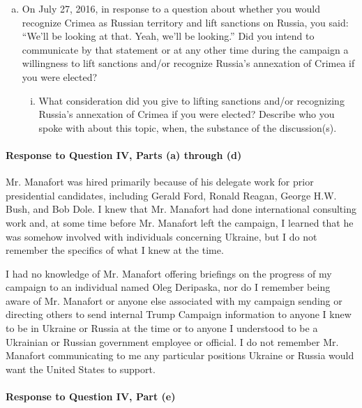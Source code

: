 \begin{enumerate}[a.]
\item On July 27, 2016, in response to a question about whether you would recognize Crimea as Russian territory and lift sanctions on Russia, you said: “We'll be looking at that. Yeah, we'll be looking.”
Did you intend to communicate by that statement or at any other time during the campaign a willingness to lift sanctions and/or recognize Russia’s annexation of Crimea if you were elected?

\begin{enumerate}[i.]

\item What consideration did you give to lifting sanctions and/or recognizing Russia’s annexation of Crimea if you were elected?
Describe who you spoke with about this topic, when, the substance of the discussion(s).

\end{enumerate}

\end{enumerate}

\paragraph*{Response to Question IV, Parts (a) through (d)}

Mr. Manafort was hired primarily because of his delegate work for prior presidential candidates, including Gerald Ford, Ronald Reagan, George H.W. Bush, and Bob Dole.
I knew that Mr. Manafort had done international consulting work and, at some time before Mr. Manafort left the campaign, I learned that he was somehow involved with individuals concerning Ukraine, but I do not remember the specifics of what I knew at the time.

I had no knowledge of Mr. Manafort offering briefings on the progress of my campaign to an individual named Oleg Deripaska, nor do I remember being aware of Mr. Manafort or anyone else associated with my campaign sending or directing others to send internal Trump Campaign information to anyone I knew to be in Ukraine or Russia at the time or to anyone I understood to be a Ukrainian or Russian government employee or official.
I do not remember Mr. Manafort communicating to me any particular positions Ukraine or Russia would want the United States to support.

\paragraph*{Response to Question IV, Part (e)}

